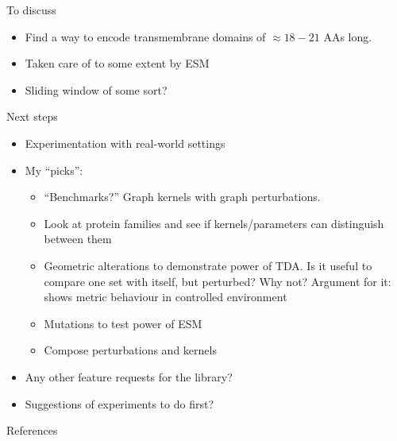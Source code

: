 \documentclass[aspectratio=169, 10pt, dvipsnames]{beamer}
\begin{document}
\begin{frame}[fragile]{To discuss}
  \begin{itemize}
  \item Find a way to encode transmembrane domains of $\approx18-21$ AAs long.
  \item Taken care of to some extent by ESM
  \item Sliding window of some sort?
  \end{itemize}
\end{frame}

\begin{frame}[fragile]{Next steps}
  \begin{itemize}
  \item Experimentation with real-world settings
    \pause
  \item My ``picks'':
    \begin{itemize}
    \item ``Benchmarks?'' Graph kernels with graph perturbations.
    \item Look at protein families and see if kernels/parameters can distinguish
      between them
    \item Geometric alterations to demonstrate power of TDA. Is it useful to
      compare one set with itself, but perturbed? Why not? Argument for it:
      shows metric behaviour in controlled environment
    \item Mutations to test power of ESM
    \item Compose perturbations and kernels
    \end{itemize}
    \pause
  \item Any other feature requests for the library?
    \pause
  \item Suggestions of experiments to do first?
  \end{itemize}
\end{frame}

\begin{frame}[allowframebreaks]{References}

  
  

\end{frame}
\end{document}
